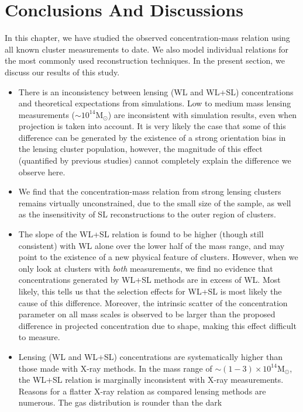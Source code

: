 \section{Conclusions And Discussions}
In this chapter, we have studied the observed concentration-mass relation using
all known cluster measurements to date. We also model individual relations for
the most commonly used reconstruction techniques. In the present section, we
discuss our results of this study.

\begin{itemize}
\item There is an inconsistency between lensing (WL and WL+SL) concentrations
  and theoretical expectations from simulations. Low to medium mass lensing
  measurements ($\mathrm{\sim 10^{14} M_{\odot}}$) are inconsistent with
  simulation results, even when projection is taken into account. It is very
  likely the case that some of this difference can be generated by the
  existence of a strong orientation bias in the lensing cluster population,
  however, the magnitude of this effect (quantified by previous studies) cannot
  completely explain the difference we observe here.
\item We find that the concentration-mass relation from strong lensing
  clusters remains virtually unconstrained, due to the small size of the
  sample, as well as the insensitivity of SL reconstructions to the outer
  region of clusters.
\item The slope of the WL+SL relation is found to be higher (though still consistent)
  with WL alone over the lower half of the mass range, and may point to the existence
  of a new physical feature of clusters. However, when we only look at clusters
  with {\em both} measurements, we find no evidence that concentrations
  generated by WL+SL methods are in excess of WL. Most likely, this tells us
  that the selection effects for WL+SL is most likely the cause of this
  difference. Moreover, the intrinsic scatter of the concentration parameter on all
  mass scales is observed to be larger than the proposed difference in
  projected concentration due to shape, making this effect difficult to measure.
\item Lensing (WL and WL+SL) concentrations are systematically higher than
  those made with X-ray methods. In the mass range of $\mathrm{\sim (1-3)
    \times 10^{14} M_{\odot}}$, the WL+SL relation is marginally inconsistent
  with X-ray measurements. Reasons for a flatter X-ray relation as compared
  lensing methods are numerous. The gas distribution is rounder than the dark

\end{itemize}
